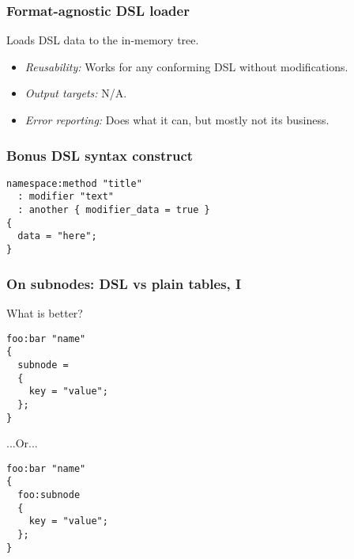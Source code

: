 \documentclass[handout]{beamer}
\begin{document}

\begin{frame}

\frametitle{Format-agnostic DSL loader}

Loads DSL data to the in-memory tree.

\begin{itemize}
\item \emph{Reusability:} Works for any conforming DSL without modifications.
\item \emph{Output targets:} N/A.
\item \emph{Error reporting:} Does what it can, but mostly not its business.
\end{itemize}

\end{frame}


\begin{frame}[fragile]

\frametitle{Bonus DSL syntax construct}

\begin{verbatim}
namespace:method "title"
  : modifier "text"
  : another { modifier_data = true }
{
  data = "here";
}
\end{verbatim}

\end{frame}


\begin{frame}[fragile]

\frametitle{On subnodes: DSL vs plain tables, I}

What is better?

\begin{verbatim}
foo:bar "name"
{
  subnode =
  {
    key = "value";
  };
}
\end{verbatim}

...Or...

\begin{verbatim}
foo:bar "name"
{
  foo:subnode
  {
    key = "value";
  };
}
\end{verbatim}

\end{frame}

\end{document}
